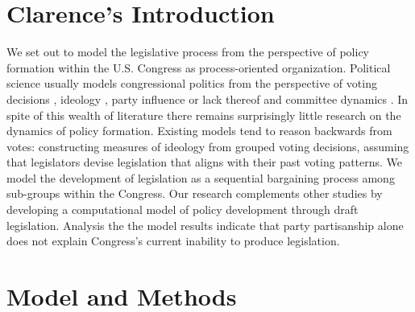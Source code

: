 \documentclass[pdftex,12pt]{llncs}
\begin{document}
\section{Clarence's Introduction}
%
%
%
%
We set out to model the legislative process from the perspective of policy formation within the U.S. Congress as process-oriented organization. 
Political science usually models congressional politics from the perspective of voting decisions \parencite{m74, k89}, ideology \parencite{pr97}, party influence \parencite{cm93,cm05,a95} or lack thereof \parencite{k91, k98} and committee dynamics \parencite{sw87, gk89, m04}. 
In spite of this wealth of literature there remains surprisingly little research on the dynamics of policy formation. 
Existing models tend to reason backwards from votes: constructing measures of ideology from grouped voting decisions, assuming that legislators devise legislation that aligns with their past voting patterns.   
We model the development of legislation as a sequential bargaining process among sub-groups within the Congress. 
Our research complements other studies by developing a computational model of policy development through draft legislation.
Analysis the the model results indicate that party partisanship alone does not explain Congress's current inability to produce legislation.  


\section{Model and Methods}
%
%
\end{document}
